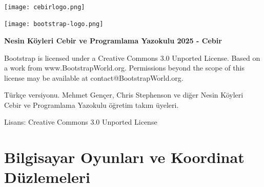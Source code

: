 \documentclass[12pt, a4paper]{article}
\begin{document}
\setcounter{page}{1}
\\
\vspace*{0.8cm}
\begin{center}
\texttt{[image: cebirlogo.png]}

\texttt{[image: bootstrap-logo.png]}
 
\end{center}

\vspace*{0.2cm}


\begin{center}
{\Large \bf{Nesin Köyleri Cebir ve Programlama Yazokulu 2025 - Cebir}}

{\tiny Bootstrap is licensed under a Creative Commons 3.0 Unported License. Based on a work from
www.BootstrapWorld.org. Permissions beyond the scope of this license may be available at
contact@BootstrapWorld.org.

Türkçe versiyonu. Mehmet Gençer, Chris Stephenson ve diğer Nesin Köyleri Cebir ve Programlama Yazokulu öğretim takım üyeleri.

Lisans: Creative Commons 3.0 Unported License} 
\end{center}

\newpage


\tableofcontents
\newpage
\section*{Bilgisayar Oyunları ve Koordinat Düzlemeleri}

\end{document}
